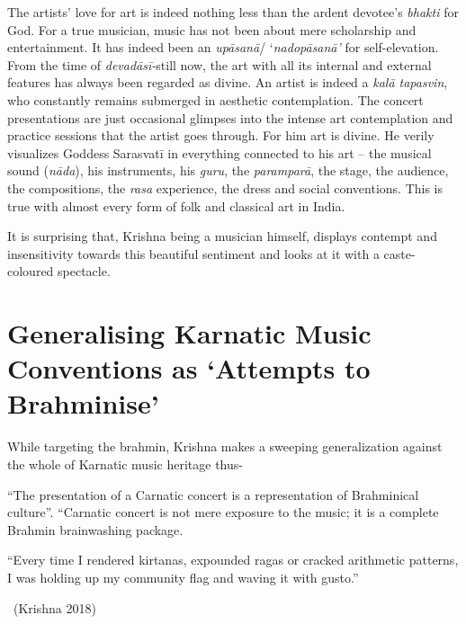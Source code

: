 The artists’ love for art is indeed nothing less than the ardent devotee’s \textit{bhakti} for God. For a true musician, music has not been about mere scholarship and entertainment. It has indeed been an \textit{upāsanā}/ ‘\textit{nadopāsanā’} for self-elevation. From the time of \textit{devadāsī-}s\break till now, the art with all its internal and external features has always been regarded as divine. An artist is indeed a \textit{kalā tapasvin}, who constantly remains submerged in aesthetic contemplation. The concert presentations are just occasional glimpses into the intense art contemplation and practice sessions that the artist goes through. For him art is divine. He verily visualizes Goddess Sarasvatī in everything connected to his art – the musical sound (\textit{nāda}), his instruments, his \textit{guru}, the \textit{paramparā}, the stage, the audience, the compositions, the \textit{rasa} experience, the dress and social conventions. This is true with almost every form of folk and classical art in India.

It is surprising that, Krishna being a musician himself, displays contempt and insensitivity towards this beautiful sentiment and looks at it with a caste-coloured spectacle.

\vspace{-.4cm}

\section*{Generalising Karnatic Music Conventions as ‘Attempts to Brahminise’}

While targeting the brahmin, Krishna makes a sweeping generalization against the whole of Karnatic music heritage thus-

\begin{myquote}
“The presentation of a Carnatic concert is a representation of Brahminical culture”. “Carnatic concert is not mere exposure to the music; it is a complete Brahmin brainwashing package.
\end{myquote}

\begin{myquote}
“Every time I rendered kirtanas, expounded ragas or cracked arithmetic patterns, I was holding up my community flag and waving it with gusto.” 

~\hfill (Krishna 2018)
\end{myquote}

